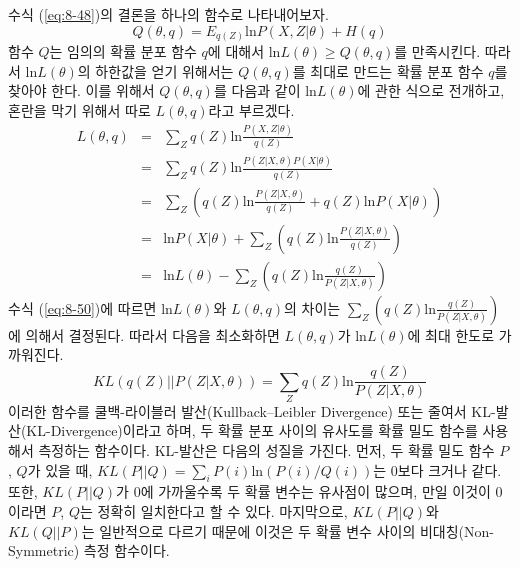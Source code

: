 \documentclass[a4paper]{oblivoir}
\begin{document}
수식 (\ref{eq:8-48})의 결론을 하나의 함수로 나타내어보자.
\begin{equation}
Q(\theta, q) = E_{q(Z)} \textrm{ln} P(X, Z|\theta) + H(q) \label{eq:8-49}
\end{equation}
함수 $Q$는 임의의 확률 분포 함수 $q$에 대해서 $\textrm{ln} L(\theta) \geq Q(\theta, q)$를 만족시킨다. 따라서 $\textrm{ln} L(\theta)$의 하한값을 얻기 위해서는 $Q(\theta, q)$를 최대로 만드는 확률 분포 함수 $q$를 찾아야 한다. 이를 위해서 $Q(\theta, q)$를 다음과 같이 $\textrm{ln} L(\theta)$에 관한 식으로 전개하고, 혼란을 막기 위해서 따로 $L(\theta, q)$라고 부르겠다. 
\begin{eqnarray}
L(\theta, q) & = & \sum_{Z} q(Z) \textrm{ln} \frac{P(X, Z|\theta)}{q(Z)} \nonumber  \\
& = & \sum_{Z} q(Z) \textrm{ln} \frac{P(Z|X,\theta) P(X|\theta)}{q(Z)} \nonumber  \\
& = & \sum_{Z} (q(Z) \textrm{ln} \frac{P(Z|X,\theta)}{q(Z)} + q(Z) \textrm{ln} P(X|\theta))  \nonumber  \\
& = & \textrm{ln} P(X|\theta) + \sum_{Z} (q(Z) \textrm{ln} \frac{P(Z|X,\theta)}{q(Z)}) \nonumber  \\
& = & \textrm{ln} L(\theta) - \sum_{Z} (q(Z) \textrm{ln} \frac{q(Z)}{P(Z|X,\theta)}) \label{eq:8-50} 
\end{eqnarray}
수식 (\ref{eq:8-50})에 따르면 $\textrm{ln} L(\theta)$와 $L(\theta, q)$의 차이는 $\sum_{Z} (q(Z) \textrm{ln} \frac{q(Z)}{P(Z|X,\theta)})$에 의해서 결정된다. 따라서 다음을 최소화하면 $L(\theta, q)$가 $\textrm{ln} L(\theta)$에 최대 한도로 가까워진다. 
\begin{equation}
KL(q(Z) || P(Z|X,\theta)) = \sum_{Z} q(Z) \textrm{ln} \frac{q(Z)}{P(Z|X,\theta)} \label{eq:8-51}
\end{equation}
이러한 함수를 쿨백-라이블러 발산(Kullback–Leibler Divergence) 또는 줄여서 KL-발산(KL-Divergence)이라고 하며, 두 확률 분포 사이의 유사도를 확률 밀도 함수를 사용해서 측정하는 함수이다. KL-발산은 다음의 성질을 가진다. 먼저, 두 확률 밀도 함수 $P$, $Q$가 있을 때, $KL(P || Q) = \sum_{i} P(i) \textrm{ln} (P(i) / Q(i))$는 0보다 크거나 같다. 또한, $KL(P || Q)$가 0에 가까울수록 두 확률 변수는 유사점이 많으며, 만일 이것이 0이라면 $P$, $Q$는 정확히 일치한다고 할 수 있다. 마지막으로, $KL(P || Q)$와 $KL(Q || P)$는 일반적으로 다르기 때문에 이것은 두 확률 변수 사이의 비대칭(Non-Symmetric) 측정 함수이다. \\     
\end{document}
